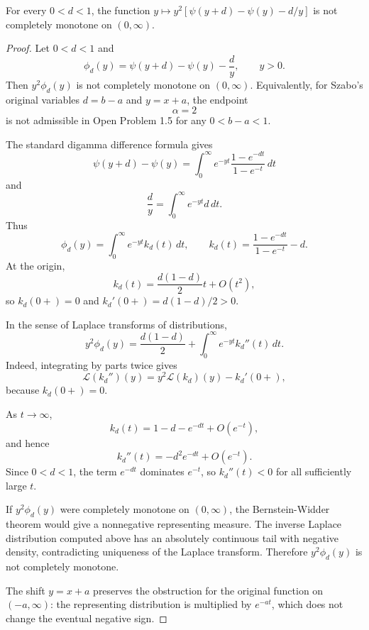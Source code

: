 \begin{counterexample}[Szabo psi difference endpoint alpha=2 is not completely monotone for all 0<d<1]
\label{res:szabo-psi-difference-alpha2-not-cm}
For every \(0<d<1\), the function \(y\mapsto y^2\left[\psi(y+d)-\psi(y)-d/y\right]\) is not completely monotone on \((0,\infty)\).
\end{counterexample}
\begin{proof}
Let \(0<d<1\) and
\[
\phi_d(y)=\psi(y+d)-\psi(y)-\frac{d}{y},\qquad y>0.
\]
Then \(y^2\phi_d(y)\) is not completely monotone on \((0,\infty)\). Equivalently, for Szabo's original variables \(d=b-a\) and \(y=x+a\), the endpoint
\[
\alpha=2
\]
is not admissible in Open Problem 1.5 for any \(0<b-a<1\).

The standard digamma difference formula gives
\[
\psi(y+d)-\psi(y)=\int_0^\infty e^{-yt}\frac{1-e^{-dt}}{1-e^{-t}}\,dt
\]
and
\[
\frac{d}{y}=\int_0^\infty e^{-yt}d\,dt.
\]
Thus
\[
\phi_d(y)=\int_0^\infty e^{-yt}k_d(t)\,dt,\qquad
k_d(t)=\frac{1-e^{-dt}}{1-e^{-t}}-d.
\]
At the origin,
\[
k_d(t)=\frac{d(1-d)}2t+O(t^2),
\]
so \(k_d(0+)=0\) and \(k_d'(0+)=d(1-d)/2>0\).

In the sense of Laplace transforms of distributions,
\[
y^2\phi_d(y)
=\frac{d(1-d)}2+\int_0^\infty e^{-yt}k_d''(t)\,dt.
\]
Indeed, integrating by parts twice gives
\[
\mathcal L(k_d'')(y)=y^2\mathcal L(k_d)(y)-k_d'(0+),
\]
because \(k_d(0+)=0\).

As \(t\to\infty\),
\[
k_d(t)=1-d-e^{-dt}+O(e^{-t}),
\]
and hence
\[
k_d''(t)=-d^2e^{-dt}+O(e^{-t}).
\]
Since \(0<d<1\), the term \(e^{-dt}\) dominates \(e^{-t}\), so \(k_d''(t)<0\) for all sufficiently large \(t\).

If \(y^2\phi_d(y)\) were completely monotone on \((0,\infty)\), the Bernstein-Widder theorem would give a nonnegative representing measure. The inverse Laplace distribution computed above has an absolutely continuous tail with negative density, contradicting uniqueness of the Laplace transform. Therefore \(y^2\phi_d(y)\) is not completely monotone.

The shift \(y=x+a\) preserves the obstruction for the original function on \((-a,\infty)\): the representing distribution is multiplied by \(e^{-at}\), which does not change the eventual negative sign.
\end{proof}

